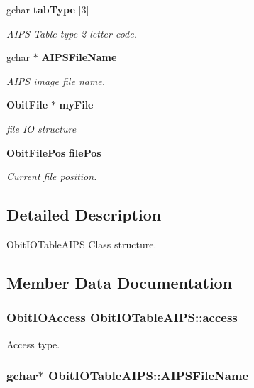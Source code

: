 \begin{CompactItemize}
gchar {\bf tab\-Type} [3]
\begin{CompactList}\small\item\em AIPS Table type 2 letter code. \item\end{CompactList}\item 
gchar $\ast$ {\bf AIPSFile\-Name}
\begin{CompactList}\small\item\em AIPS image file name. \item\end{CompactList}\item 
{\bf Obit\-File} $\ast$ {\bf my\-File}
\begin{CompactList}\small\item\em file IO structure \item\end{CompactList}\item 
{\bf Obit\-File\-Pos} {\bf file\-Pos}
\begin{CompactList}\small\item\em Current file position. \item\end{CompactList}\end{CompactItemize}


\subsection{Detailed Description}
Obit\-IOTable\-AIPS Class structure. 



\subsection{Member Data Documentation}
\subsubsection{\setlength{\rightskip}{0pt plus 5cm}Obit\-IOAccess {\bf Obit\-IOTable\-AIPS::access}}\label{structObitIOTableAIPS_o4}


Access type. 

\subsubsection{\setlength{\rightskip}{0pt plus 5cm}gchar$\ast$ {\bf Obit\-IOTable\-AIPS::AIPSFile\-Name}}\label{structObitIOTableAIPS_o16}


